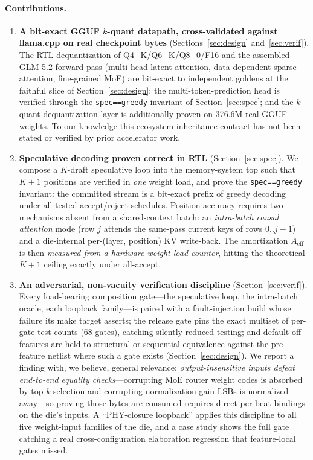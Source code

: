\documentclass[11pt]{article}
\newcommand{\code}[1]{\texttt{#1}}
\begin{document}
\paragraph{Contributions.}
\begin{enumerate}[leftmargin=1.4em,itemsep=2pt]
\item \textbf{A bit-exact GGUF $k$-quant datapath, cross-validated against
llama.cpp on real checkpoint bytes} (Sections~\ref{sec:design}
and~\ref{sec:verif}). The RTL dequantization of Q4\_K/Q6\_K/Q8\_0/F16 and the
assembled GLM-5.2 forward pass (multi-head latent attention, data-dependent
sparse attention, fine-grained MoE) are bit-exact to independent goldens at the
faithful slice of Section~\ref{sec:design}; the multi-token-prediction head is
verified through the \code{spec==greedy} invariant of Section~\ref{sec:spec};
and the $k$-quant dequantization layer is additionally proven on 376.6M real
GGUF weights. To our knowledge this ecosystem-inheritance contract has not been
stated or verified by prior accelerator work.

\item \textbf{Speculative decoding proven correct in RTL} (Section~\ref{sec:spec}).
We compose a $K$-draft speculative loop into the memory-system top such that
$K{+}1$ positions are verified in \emph{one} weight load, and prove the
\code{spec==greedy} invariant: the committed stream is a bit-exact prefix of
greedy decoding under all tested accept/reject schedules. Position accuracy
requires two mechanisms absent from a shared-context batch: an
\emph{intra-batch causal attention} mode (row $j$ attends the same-pass current
keys of rows $0..j{-}1$) and a die-internal per-(layer, position) KV
write-back. The amortization $A_{\mathrm{eff}}$ is then \emph{measured from a
hardware weight-load counter}, hitting the theoretical $K{+}1$ ceiling exactly
under all-accept.

\item \textbf{An adversarial, non-vacuity verification discipline}
(Section~\ref{sec:verif}). Every load-bearing composition gate---the
speculative loop, the intra-batch oracle, each loopback family---is paired
with a fault-injection build whose failure its make target asserts; the
release gate pins the exact multiset of per-gate test counts (68 gates),
catching silently reduced testing; and default-off features are held to
structural or sequential equivalence against the pre-feature netlist where
such a gate exists (Section~\ref{sec:design}). We report a finding with, we believe,
general relevance: \emph{output-insensitive inputs defeat end-to-end equality
checks}---corrupting MoE router weight codes is absorbed by top-$k$ selection
and corrupting normalization-gain LSBs is normalized away---so proving those
bytes are consumed requires direct per-beat bindings on the die's inputs. A
``PHY-closure loopback'' applies this discipline to all five weight-input
families of the die, and a case study shows the full gate catching a real
cross-configuration elaboration regression that feature-local gates missed.


\end{enumerate}
\end{document}
